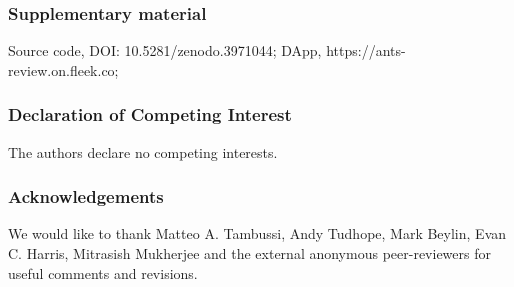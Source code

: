 \documentclass[runningheads]{llncs}
\begin{document}
\small{
\subsubsection{Supplementary material}
Source code, DOI: 10.5281/zenodo.3971044; 
\newline DApp, https://ants-review.on.fleek.co;

\subsubsection{Declaration of Competing Interest}
The authors declare no competing interests.

\subsubsection{Acknowledgements} We would like to thank Matteo A. Tambussi, Andy Tudhope, Mark Beylin, Evan C. Harris, Mitrasish Mukherjee and the external anonymous peer-reviewers for useful comments and revisions.}


%
%


\end{document}
